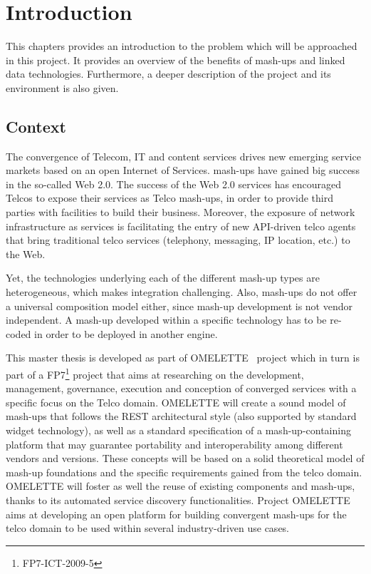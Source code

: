\cleardoublepage
\chapter{Introduction}

\begin{chapterintro}

This chapters provides an introduction to the problem which will be approached in this project. It provides an overview of the benefits of mash-ups and linked data technologies. Furthermore, a deeper description of the project and its environment is also given.

\end{chapterintro}

\cleardoublepage
\section{Context}

The convergence of Telecom, IT and content services drives new emerging service markets based on an open Internet of Services. mash-ups have gained big success in the so-called Web 2.0. The success of the Web 2.0 services has encouraged Telcos to expose their services as Telco mash-ups, in order to provide third parties with facilities to build their business. Moreover, the exposure of network infrastructure as services is facilitating the entry of new API-driven telco agents that bring traditional telco services (telephony, messaging, IP location, etc.) to the Web.

Yet, the technologies underlying each of the different mash-up types are heterogeneous, which makes integration challenging. Also, mash-ups do not offer a universal composition model either, since mash-up development is not vendor independent. A mash-up developed within a specific technology has to be re-coded in order to be deployed in another engine.

This master thesis is developed as part of OMELETTE~\cite{chudnovskyy2012end} project which in turn is part of a FP7\footnote{FP7-ICT-2009-5} project that aims at researching on the development, management, governance, execution and conception of converged services with a specific focus on the Telco domain. OMELETTE will create a sound model of mash-ups that follows the REST architectural style (also supported by standard widget technology), as well as a standard specification of a mash-up-containing platform that may guarantee portability and interoperability among different vendors and versions. These concepts will be based on a solid theoretical model of mash-up foundations and the specific requirements gained from the telco domain. OMELETTE will foster as well the reuse of existing components and mash-ups, thanks to its automated service discovery functionalities. Project OMELETTE aims at developing an open platform for building convergent mash-ups for the telco domain to be used within several industry-driven use cases. 

